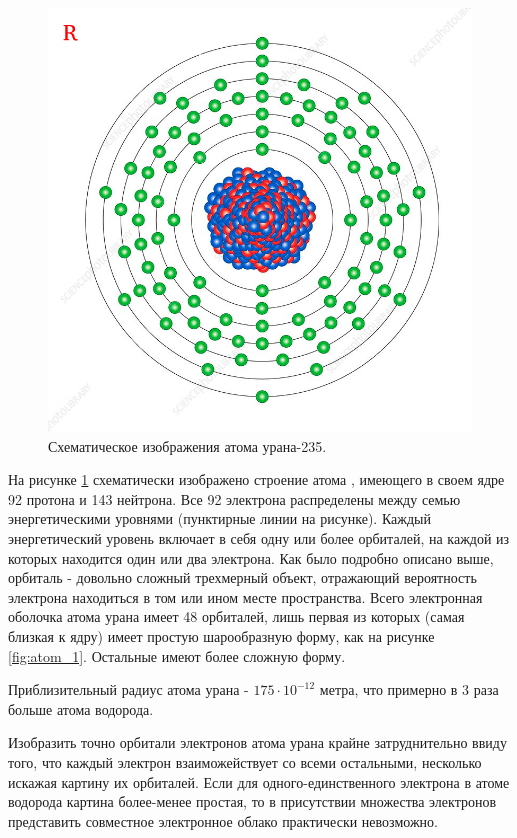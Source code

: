 \begin{figure}[t!]
   \centering
   \includegraphics[scale=0.6]{images/uranium_1}
   \caption{Схематическое изображения атома урана-235.}
   \label{fig:uranium_1}
\end{figure}

На рисунке \ref{fig:uranium_1} схематически изображено строение атома , имеющего в своем ядре 92 протона и 143 нейтрона.
Все 92 электрона распределены между семью энергетическими уровнями (пунктирные линии на рисунке).
Каждый энергетический уровень включает в себя одну или более орбиталей, на каждой из которых находится один или два электрона.
Как было подробно описано выше, орбиталь - довольно сложный трехмерный объект, отражающий вероятность электрона находиться в том или ином месте пространства. 
Всего электронная оболочка атома урана имеет 48 орбиталей, лишь первая из которых (самая близкая к ядру) имеет простую шарообразную форму, как на рисунке \ref{fig:atom_1}.
Остальные имеют более сложную форму.

Приблизительный радиус атома урана - $175\cdot 10^{-12}$ метра, что примерно в 3 раза больше атома водорода.


Изобразить точно орбитали электронов атома урана крайне затруднительно ввиду того, что каждый электрон взаиможействует со всеми остальными, несколько искажая картину их орбиталей.
Если для одного-единственного электрона в атоме водорода картина более-менее простая, то в присутствии множества электронов представить совместное электронное облако практически невозможно.
  






